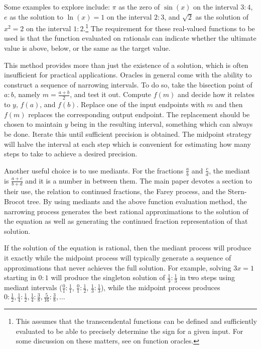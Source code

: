 \documentclass[12pt]{article}
\begin{document}
Some examples to explore include: $\pi$ as the zero of $\sin(x)$ on the interval $3:4$, $e$ as the solution to  $\ln(x)=1$ on the interval $2:3$, and $\sqrt{2}$ as the solution of $x^2 = 2$ on the interval $1:2$.\footnote{This assumes that the transcendental functions can be defined and sufficiently evaluated to be able to precisely determine the sign for a given input. For some discussion on these matters, see \cite{taylor23funora} on function oracles.} The requirement for these real-valued functions to be used is that the function evaluated on rationals can indicate whether the ultimate value is above, below, or the same as the target value. 

This method provides more than just the existence of a solution, which is often insufficient for practical applications. Oracles in general come with the ability to construct a sequence of narrowing intervals. To do so, take the bisection point of $a:b$, namely $m =\frac{a+b}{2}$, and test it out. Compute $f(m)$ and decide how it relates to $y$, $f(a)$, and $f(b)$. Replace one of the input endpoints with $m$ and then $f(m)$ replaces the corresponding output endpoint. The replacement should be chosen to maintain $y$ being in the resulting interval, something which can always be done. Iterate this until sufficient precision is obtained.  The midpoint strategy will halve the interval at each step which is convenient for estimating how many steps to take to achieve a desired precision. 

Another useful choice is to use mediants. For the fractions $\frac{a}{b}$ and $\frac{c}{d}$, the mediant is $\frac{a+c}{b+d}$ and it is a number in between them. The main paper devotes a section to their use, the relation to continued fractions, the Farey process, and the Stern-Brocot tree. By using mediants and the above function evaluation method, the narrowing process generates the best rational approximations to the solution of the equation as well as generating the continued fraction representation of that solution. 

If the solution of the equation is rational, then the mediant process will produce it exactly while the midpoint process will typically generate a sequence of approximations that never achieves the full solution. For example, solving $3x = 1$ starting in $0:1$ will produce the singleton solution of $\frac{1}{3}:\frac{1}{3}$ in two steps using mediant intervals ($\frac{0}{1}:\frac{1}{1}$, $\frac{0}{1}:\frac{1}{2}$, $\frac{1}{3}:\frac{1}{3}$), while the midpoint process produces $0:\frac{1}{2}, \frac{1}{4}: \frac{1}{2}, \frac{1}{4}: \frac{3}{8}, \frac{5}{16}: \frac{3}{8}, \ldots$
\end{document}
